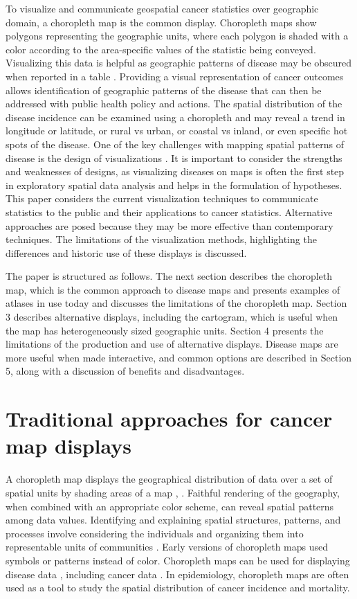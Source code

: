 \documentclass{monashthesis}
\begin{document}
To visualize and communicate geospatial cancer statistics over geographic domain, a choropleth map is the common display. Choropleth maps show polygons representing the geographic units, where each polygon is shaded with a color according to the area-specific values of the statistic being conveyed. Visualizing this data is helpful as geographic patterns of disease may be obscured when reported in a table \autocite{SAMGIS}. Providing a visual representation of cancer outcomes allows identification of geographic patterns of the disease that can then be addressed with public health policy and actions. The spatial distribution of the disease incidence can be examined using a choropleth and may reveal a trend in longitude or latitude, or rural vs urban, or coastal vs inland, or even specific hot spots of the disease. One of the key challenges with mapping spatial patterns of disease is the design of visualizations \autocite{SE}. It is important to consider the strengths and weaknesses of designs, as visualizing diseases on maps is often the first step in exploratory spatial data analysis and helps in the formulation of hypotheses. This paper considers the current visualization techniques to communicate statistics to the public and their applications to cancer statistics. Alternative approaches are posed because they may be more effective than contemporary techniques. The limitations of the visualization methods, highlighting the differences and historic use of these displays is discussed.

The paper is structured as follows. The next section describes the choropleth map, which is the common approach to disease maps and presents examples of atlases in use today and discusses the limitations of the choropleth map. Section 3 describes alternative displays, including the cartogram, which is useful when the map has heterogeneously sized geographic units. Section 4 presents the limitations of the production and use of alternative displays. Disease maps are more useful when made interactive, and common options are described in Section 5, along with a discussion of benefits and disadvantages.

\hypertarget{ch:choropleth-maps}{%
\section{Traditional approaches for cancer map displays}\label{ch:choropleth-maps}}

A choropleth map displays the geographical distribution of data over a set of spatial units by shading areas of a map \autocite{EI}, \autocite{BCM}. Faithful rendering of the geography, when combined with an appropriate color scheme, can reveal spatial patterns among data values. Identifying and explaining spatial structures, patterns, and processes involve considering the individuals and organizing them into representable units of communities \autocite{SAMGIS}. Early versions of choropleth maps used symbols or patterns instead of color. Choropleth maps can be used for displaying disease data \autocite{DMAHP}, including cancer data \autocite{CPISACA}. In epidemiology, choropleth maps are often used as a tool to study the spatial distribution of cancer incidence and mortality.
\end{document}
